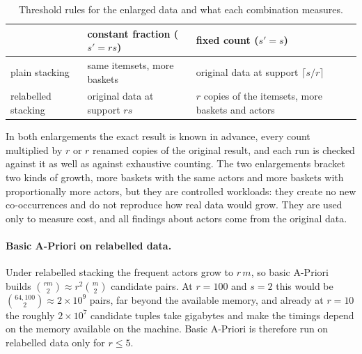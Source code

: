 \begin{table}[ht]
  \centering
  \caption{Threshold rules for the enlarged data and what each combination measures.}
  \label{tab:threshold-rules}
  \small
  \begin{tabular}{lp{4.2cm}p{4.6cm}}
    \toprule
    & constant fraction ($s' = r s$) & fixed count ($s' = s$) \\
    \midrule
    plain stacking & same itemsets, more baskets & original data at support $\lceil s / r \rceil$ \\
    relabelled stacking & original data at support $r s$ & $r$ copies of the itemsets, more baskets and actors \\
    \bottomrule
  \end{tabular}
\end{table}

In both enlargements the exact result is known in advance, every count multiplied by $r$ or $r$ renamed copies of the original result, and each run is checked against it as well as against exhaustive counting. The two enlargements bracket two kinds of growth, more baskets with the same actors and more baskets with proportionally more actors, but they are controlled workloads: they create no new co-occurrences and do not reproduce how real data would grow. They are used only to measure cost, and all findings about actors come from the original data.

\paragraph{Basic A-Priori on relabelled data.} Under relabelled stacking the frequent actors grow to $r\,m$, so basic A-Priori builds $\binom{r m}{2} \approx r^2 \binom{m}{2}$ candidate pairs. At $r = 100$ and $s = 2$ this would be $\binom{64{,}100}{2} \approx 2 \times 10^9$ pairs, far beyond the available memory, and already at $r = 10$ the roughly $2 \times 10^7$ candidate tuples take gigabytes and make the timings depend on the memory available on the machine. Basic A-Priori is therefore run on relabelled data only for $r \le 5$.
